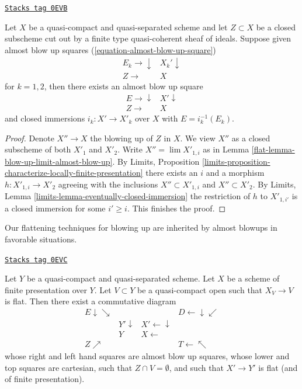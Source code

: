 \begin{lemma}
\label{flat-lemma-almost-blow-up-unique}
\href{https://stacks.math.columbia.edu/tag/0EVB}{\texttt{Stacks tag 0EVB}}

Let $X$ be a quasi-compact and quasi-separated scheme and let $Z \subset X$
be a closed subscheme cut out by a finite type quasi-coherent sheaf of ideals.
Suppose given almost blow up squares (\ref{equation-almost-blow-up-square})
$$
\begin{array}{cc}E_k \longrightarrow\downarrow & X_k' \downarrow \\ Z \longrightarrow & X\end{array}
$$
for $k = 1, 2$, then there exists an almost blow up square
$$
\begin{array}{cc}E \longrightarrow\downarrow & X' \downarrow \\ Z \longrightarrow & X\end{array}
$$
and closed immersions $i_k : X' \to X'_k$ over $X$
with $E = i_k^{-1}(E_k)$.
\end{lemma}

\begin{proof}

Denote $X'' \to X$ the blowing up of $Z$ in $X$.
We view $X''$ as a closed subscheme of both $X'_1$ and $X'_2$.
Write $X'' = \lim X'_{1, i}$ as in
Lemma \ref{flat-lemma-blow-up-limit-almost-blow-up}.
By Limits, Proposition
\ref{limits-proposition-characterize-locally-finite-presentation}
there exists an $i$ and a morphism $h : X'_{1, i} \to X'_2$ agreeing
with the inclusions $X'' \subset X'_{1, i}$ and $X'' \subset X'_2$.
By Limits, Lemma \ref{limits-lemma-eventually-closed-immersion}
the restriction of $h$ to $X'_{1, i'}$ is a closed immersion
for some $i' \geq i$. This finishes the proof.
\end{proof}

Our flattening techniques for blowing up are inherited by
almost blowups in favorable situations.

\begin{lemma}
\label{flat-lemma-flat-after-almost-blowing-up}
\href{https://stacks.math.columbia.edu/tag/0EVC}{\texttt{Stacks tag 0EVC}}

Let $Y$ be a quasi-compact and quasi-separated scheme.
Let $X$ be a scheme of finite presentation over $Y$.
Let $V \subset Y$ be a quasi-compact open such that
$X_V \to V$ is flat. Then there exist a commutative diagram
$$
\begin{array}{cccc}E \downarrow\searrow &  &  & D \longleftarrow\downarrow\swarrow \\  & Y' \downarrow & X' \longleftarrow\downarrow &  \\  & Y & X \longleftarrow &  \\ Z \nearrow &  &  & T \longleftarrow\nwarrow\end{array}
$$
whose right and left hand squares are almost blow up squares,
whose lower and top squares are cartesian, such that
$Z \cap V = \emptyset$, and
such that $X' \to Y'$ is flat (and of finite presentation).
\end{lemma}

